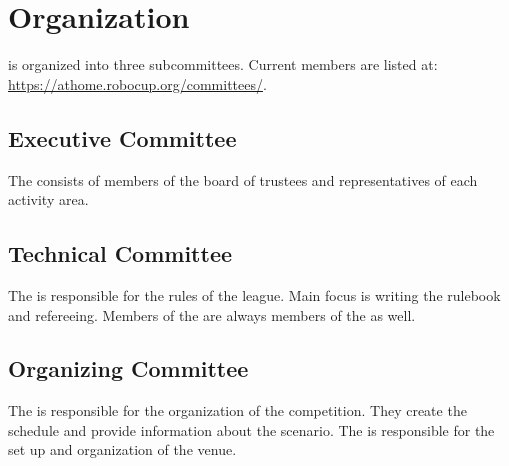 \section{Organization}
\label{sec:introduction:organization}
\AtHome{} is organized into three subcommittees. Current members are listed at: 
\url{https://athome.robocup.org/committees/}.

\subsection{Executive Committee}
\label{sec:introduction:ec}
The \EC{} consists of members of the board of trustees and representatives of each activity area.

\subsection{Technical Committee}
\label{sec:introduction:tc}
The \TC{} is responsible for the rules of the league. Main focus is writing the rulebook and refereeing.
Members of the \EC{} are always members of the \TC{} as well.

\subsection{Organizing Committee}
\label{sec:introduction:oc}
The \OC{} is responsible for the organization of the competition. They create the schedule and provide information about the scenario.
The \LOC{} is responsible for the set up and organization of the venue.
